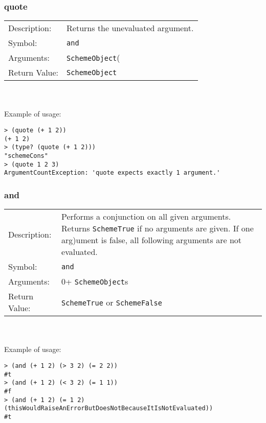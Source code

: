 \documentclass[12pt,a4paper]{scrartcl}
\begin{document}
\subsubsection{quote}
\begin{tabular}{l  p{13cm}}
Description: & Returns the unevaluated argument.\\
Symbol: & \lstinline{and}\\
Arguments: & \lstinline{SchemeObject}( \\
Return Value: & \lstinline{SchemeObject}\\
\end{tabular}
\\
\\
Example of usage:
\begin{lstlisting}
> (quote (+ 1 2))
(+ 1 2)
> (type? (quote (+ 1 2)))
"schemeCons"
> (quote 1 2 3)
ArgumentCountException: 'quote expects exactly 1 argument.' 
\end{lstlisting}

\subsubsection{and}
\begin{tabular}{l  p{13cm}}
Description: & Performs a conjunction on all given arguments. Returns \lstinline{SchemeTrue} if no arguments are given. If one arg)ument is false, all following arguments are not evaluated. \\
Symbol: & \lstinline{and}\\
Arguments: & 0+ \lstinline{SchemeObject}s \\
Return Value: & \lstinline{SchemeTrue} or \lstinline{SchemeFalse}\\
\end{tabular}
\\
\\
Example of usage:
\begin{lstlisting}
> (and (+ 1 2) (> 3 2) (= 2 2))
#t
> (and (+ 1 2) (< 3 2) (= 1 1))
#f
> (and (+ 1 2) (= 1 2) (thisWouldRaiseAnErrorButDoesNotBecauseItIsNotEvaluated))
#t
\end{lstlisting}
\end{document}
